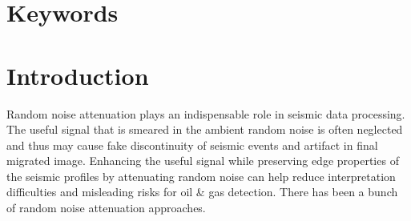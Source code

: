 \section{Keywords}

\section{Introduction}
Random noise attenuation plays an indispensable role in seismic data processing. The useful signal that is smeared in the ambient random noise is often neglected and thus may cause fake discontinuity of seismic events and artifact in final migrated image. Enhancing the useful signal while preserving edge properties of the seismic profiles by attenuating random noise can help reduce interpretation difficulties and misleading risks for oil \& gas detection. There has been a bunch of random noise attenuation approaches. 

